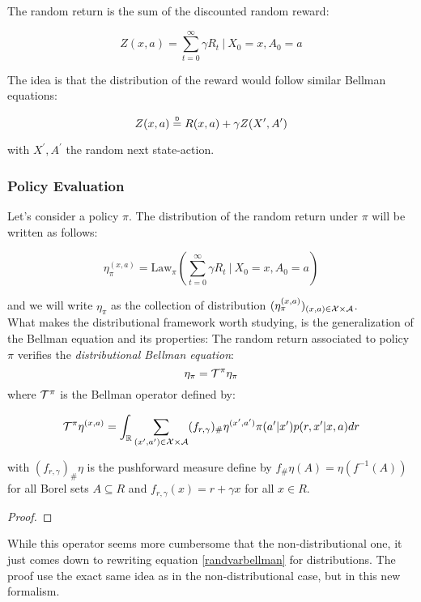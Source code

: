 The random return is the sum of the discounted random reward:

\begin{equation}
    Z(x,a) = \sum_{t = 0}^{\infty} \gamma R_t \ |\ X_0 = x, A_0 = a
\end{equation}

The idea is that the distribution of the reward would follow similar Bellman equations:

\begin{equation}\label{randvarbellman}
    Z(x,a) \deq R(x,a) + \gamma Z(X^\prime, A^\prime)
\end{equation}

with $X^\prime, A^\prime$ the random next state-action. 

\subsubsection*{Policy Evaluation}
Let’s consider a policy $\pi$. The distribution of the random return under $\pi$ will be written as follows:

\[ \eta_\pi^{(x,a)} = \text{Law}_\pi \left( \sum_{t = 0}^{\infty} \gamma R_t \ | \ X_0 = x, A_0 = a \right) \]

and we will write $\eta_\pi$ as the collection of distribution $(\eta_\pi^{(x,a)})_{(x,a) \in \mathcal{X} \times \mathcal{A}}$.\\

What makes the distributional framework worth studying, is the generalization of the Bellman equation and its properties:
The random return associated to policy $\pi$ verifies the \emph{distributional Bellman equation}:
\[\eta_\pi = \mathcal{T}^\pi \eta_\pi \]
where $\mathcal{T}^\pi$ is the Bellman operator defined by:

\[
    \mathcal{T}^\pi \eta^{(x,a)} = \int_{\mathbb{R}} \sum_{(x^\prime,a^\prime)\in \mathcal{X} \times \mathcal{A}} (f_{r,\gamma})_\#\eta^{(x^\prime,a^\prime)}\pi(a^\prime|x^\prime)p(r,x^\prime|x,a)dr
\]

with $(f_{r,\gamma})_\#\eta$ is the pushforward measure define by $f_\#\eta(A) = \eta(f^{-1}(A))$ for all Borel sets $A\subseteq R$ and $f_{r,\gamma}(x) = r + \gamma x$ for all $x \in R$.
\begin{proof}
\end{proof}

While this operator seems more cumbersome that the non-distributional one, it just comes down to rewriting equation \ref{randvarbellman} for distributions. The proof use the exact same idea as in the non-distributional case, but in this new formalism. \\

